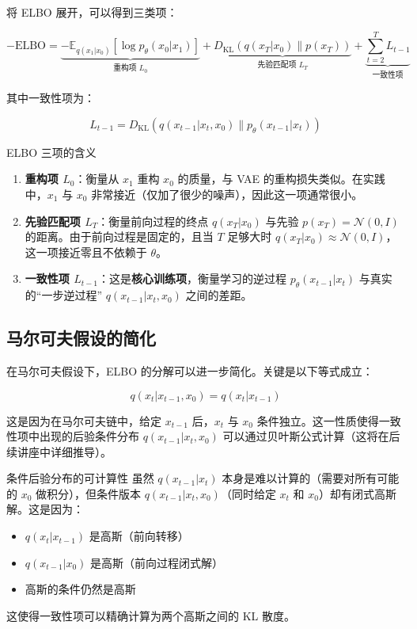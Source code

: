 \documentclass[a4paper]{article}
\begin{document}
将 ELBO 展开，可以得到三类项：

$$-\text{ELBO} = \underbrace{-\mathbb{E}_{q(x_1|x_0)}[\log p_\theta(x_0|x_1)]}_{\text{重构项 } L_0} + \underbrace{D_{\text{KL}}(q(x_T|x_0) \| p(x_T))}_{\text{先验匹配项 } L_T} + \underbrace{\sum_{t=2}^{T} L_{t-1}}_{\text{一致性项}}$$

其中一致性项为：

$$L_{t-1} = D_{\text{KL}}(q(x_{t-1}|x_t, x_0) \| p_\theta(x_{t-1}|x_t))$$

\begin{importantbox}{ELBO 三项的含义}
\begin{enumerate}
    \item \textbf{重构项 $L_0$}：衡量从 $x_1$ 重构 $x_0$ 的质量，与 VAE 的重构损失类似。在实践中，$x_1$ 与 $x_0$ 非常接近（仅加了很少的噪声），因此这一项通常很小。
    \item \textbf{先验匹配项 $L_T$}：衡量前向过程的终点 $q(x_T|x_0)$ 与先验 $p(x_T) = \mathcal{N}(0, I)$ 的距离。由于前向过程是固定的，且当 $T$ 足够大时 $q(x_T|x_0) \approx \mathcal{N}(0,I)$，这一项接近零且不依赖于 $\theta$。
    \item \textbf{一致性项 $L_{t-1}$}：这是\textbf{核心训练项}，衡量学习的逆过程 $p_\theta(x_{t-1}|x_t)$ 与真实的``一步逆过程'' $q(x_{t-1}|x_t, x_0)$ 之间的差距。
\end{enumerate}
\end{importantbox}

\subsection{马尔可夫假设的简化}

在马尔可夫假设下，ELBO 的分解可以进一步简化。关键是以下等式成立：

$$q(x_t | x_{t-1}, x_0) = q(x_t | x_{t-1})$$

这是因为在马尔可夫链中，给定 $x_{t-1}$ 后，$x_t$ 与 $x_0$ 条件独立。这一性质使得一致性项中出现的后验条件分布 $q(x_{t-1}|x_t, x_0)$ 可以通过贝叶斯公式计算（这将在后续讲座中详细推导）。

\begin{knowledgebox}{条件后验分布的可计算性}
虽然 $q(x_{t-1}|x_t)$ 本身是难以计算的（需要对所有可能的 $x_0$ 做积分），但条件版本 $q(x_{t-1}|x_t, x_0)$（同时给定 $x_t$ 和 $x_0$）却有闭式高斯解。这是因为：
\begin{itemize}
    \item $q(x_t|x_{t-1})$ 是高斯（前向转移）
    \item $q(x_{t-1}|x_0)$ 是高斯（前向过程闭式解）
    \item 高斯的条件仍然是高斯
\end{itemize}
这使得一致性项可以精确计算为两个高斯之间的 KL 散度。
\end{knowledgebox}
\end{document}
